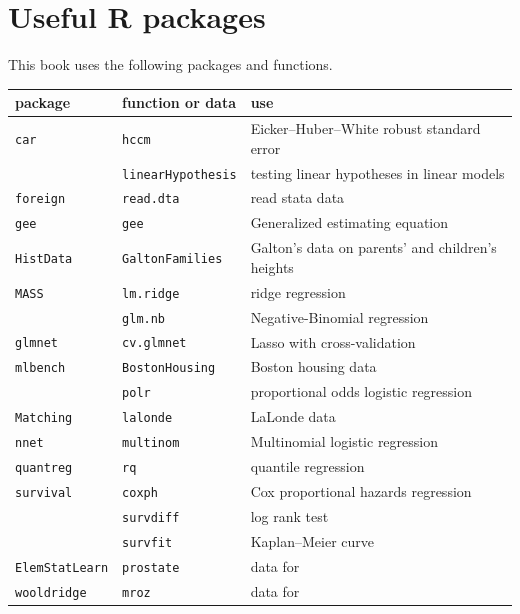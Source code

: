 \chapter*{Useful R packages}


This book uses the following  packages and functions. 

\begin{tabular}{lll}
package & function or data & use \\
\hline 
\texttt{car} & \texttt{hccm} & Eicker--Huber--White robust standard error\\
& \texttt{linearHypothesis} & testing linear hypotheses in linear models\\
\texttt{foreign} & \texttt{read.dta} & read stata data\\
\texttt{gee} & \texttt{gee} & Generalized estimating equation\\
\texttt{HistData} & \texttt{GaltonFamilies} & Galton's data on parents' and children's heights\\ 
\texttt{MASS} & \texttt{lm.ridge} & ridge regression\\
& \texttt{glm.nb} & Negative-Binomial regression \\
\texttt{glmnet}  & \texttt{cv.glmnet}  & Lasso with cross-validation \\ 
\texttt{mlbench}  & \texttt{BostonHousing}  & Boston housing data \\ 
& \texttt{polr} & proportional odds logistic regression \\ 
\texttt{Matching} & \texttt{lalonde} & LaLonde data\\
\texttt{nnet} & \texttt{multinom} & Multinomial logistic regression\\
\texttt{quantreg} & \texttt{rq} & quantile regression\\
\texttt{survival} & \texttt{coxph} & Cox proportional hazards regression\\ 
& \texttt{survdiff} & log rank test\\
& \texttt{survfit} & Kaplan--Meier curve \\
\texttt{ElemStatLearn} & \texttt{prostate} & data for \citet{hastie2009elements} \\
\texttt{wooldridge} &  \texttt{mroz} & data for \citet{wooldridge2016introductory}
\end{tabular}


